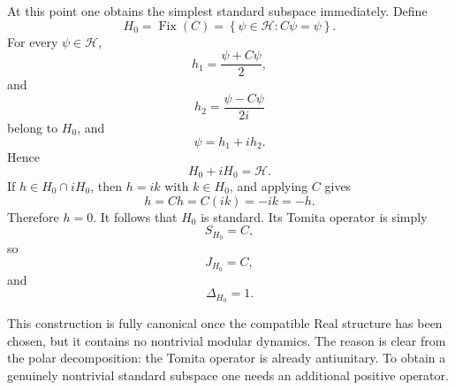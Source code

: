\documentclass[a4paper,11pt]{article}
\theoremstyle{definition}
\newcommand{\cH}{\mathcal{H}}
\begin{document}
At this point one obtains the simplest standard subspace immediately.  Define
\begin{equation}
    H_0
    =
    \operatorname{Fix}(C)
    =
    \left\{
    \psi\in\cH:
    C\psi=\psi
    \right\}.
    \label{eq:ssgq:H0}
\end{equation}
For every $\psi\in\cH$,
\begin{equation}
    h_1
    =
    \frac{\psi+C\psi}{2},
\end{equation}
and
\begin{equation}
    h_2
    =
    \frac{\psi-C\psi}{2i}
\end{equation}
belong to $H_0$, and
\begin{equation}
    \psi=h_1+ih_2.
\end{equation}
Hence
\begin{equation}
    H_0+iH_0=\cH.
\end{equation}
If $h\in H_0\cap iH_0$, then $h=ik$ with $k\in H_0$, and applying $C$ gives
\begin{equation}
    h=Ch=C(ik)=-ik=-h.
\end{equation}
Therefore $h=0$.  It follows that $H_0$ is standard.  Its Tomita operator is
simply
\begin{equation}
    S_{H_0}=C,
\end{equation}
so
\begin{equation}
    J_{H_0}=C,
\end{equation}
and
\begin{equation}
    \Delta_{H_0}=1.
    \label{eq:ssgq:trivialDelta}
\end{equation}

This construction is fully canonical once the compatible Real structure has
been chosen, but it contains no nontrivial modular dynamics.  The reason is
clear from the polar decomposition: the Tomita operator is already
antiunitary.  To obtain a genuinely nontrivial standard subspace one needs an
additional positive operator.
\end{document}
